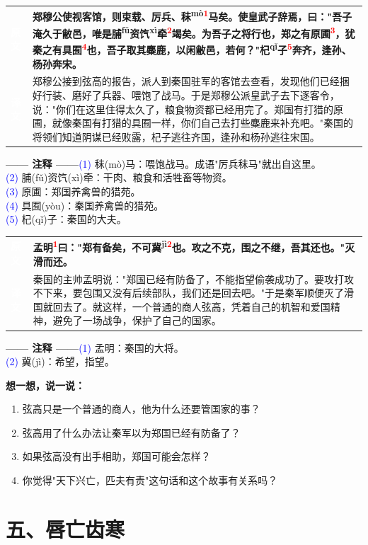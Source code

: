\documentclass[a4paper,12pt]{ctexart}
\makeatletter
\newcommand{\ruby}[2]{#1\textsuperscript{#2}}
\newlength{\colA}\setlength{\colA}{0.06\textwidth}
\newlength{\colB}\setlength{\colB}{0.64\textwidth}
\newlength{\colC}\setlength{\colC}{0.26\textwidth}
\newcommand{\sectab}[3]{%
  \noindent
  \begin{minipage}[c]{\dimexpr\colA+\colB+2\tabcolsep\relax}
  \begin{tabular}{@{}p{\colA}p{\colB}@{}}
  \sideyuan  & {\large\bfseries #1} \\
  \sideyiwen & {\large #2} \\
  \end{tabular}
  \end{minipage}
  \hfill
  \begin{minipage}[c]{\colC}
  {\labelann\vspace{0.1cm}}#3
  \end{minipage}
  \par
}
\newcommand{\sideyuan}{\colorbox{blue!70!black}{\textcolor{white}{\normalsize\textbf{原文}}}}
\newcommand{\sideyiwen}{\colorbox{green!60!black}{\textcolor{white}{\normalsize\textbf{译文}}}}
\newcommand{\labelann}{\textcolor{orange!80!black}{\small\textbf{—— 注释 ——}}}
\newcommand{\refmark}[1]{\textsuperscript{\textcolor{red}{#1}}}
\makeatother
\begin{document}
\vspace{0.3cm}
\sectab{郑穆公使视客馆，则束载、厉兵、\ruby{秣}{mò}\refmark{1}马矣。使皇武子辞焉，曰："吾子淹久于敝邑，唯是\ruby{脯}{fǔ}资\ruby{饩}{xì}牵\refmark{2}竭矣。为吾子之将行也，郑之有原圃\refmark{3}，犹秦之有具囿\refmark{4}也，吾子取其麋鹿，以闲敝邑，若何？"\ruby{杞}{qǐ}子\refmark{5}奔齐，逢孙、杨孙奔宋。}{郑穆公接到弦高的报告，派人到秦国驻军的客馆去查看，发现他们已经捆好行装、磨好了兵器、喂饱了战马。于是郑穆公派皇武子去下逐客令，说："你们在这里住得太久了，粮食物资都已经用完了。郑国有打猎的原圃，就像秦国有打猎的具囿一样，你们自己去打些麋鹿来补充吧。"秦国的将领们知道阴谋已经败露，杞子逃往齐国，逢孙和杨孙逃往宋国。}{{\small \textcolor{blue}{(1)} 秣(mò)马：喂饱战马。成语"厉兵秣马"就出自这里。}\\[0.1cm]{\small \textcolor{blue}{(2)} 脯(fǔ)资饩(xì)牵：干肉、粮食和活牲畜等物资。}\\[0.1cm]{\small \textcolor{blue}{(3)} 原圃：郑国养禽兽的猎苑。}\\[0.1cm]{\small \textcolor{blue}{(4)} 具囿(yòu)：秦国养禽兽的猎苑。}\\[0.1cm]{\small \textcolor{blue}{(5)} 杞(qǐ)子：秦国的大夫。}}

\vspace{0.3cm}
\sectab{孟明\refmark{1}曰："郑有备矣，不可\ruby{冀}{jì}\refmark{2}也。攻之不克，围之不继，吾其还也。"灭滑而还。}{秦国的主帅孟明说："郑国已经有防备了，不能指望偷袭成功了。要攻打攻不下来，要包围又没有后续部队，我们还是回去吧。"于是秦军顺便灭了滑国就回去了。就这样，一个普通的商人弦高，凭着自己的机智和爱国精神，避免了一场战争，保护了自己的国家。}{{\small \textcolor{blue}{(1)} 孟明：秦国的大将。}\\[0.1cm]{\small \textcolor{blue}{(2)} 冀(jì)：希望，指望。}}

\vspace{0.3cm}
{\large\textcolor{orange!80!black}{\textbf{想一想，说一说：}}}
\begin{enumerate}
  \item 弦高只是一个普通的商人，他为什么还要管国家的事？
  \item 弦高用了什么办法让秦军以为郑国已经有防备了？
  \item 如果弦高没有出手相助，郑国可能会怎样？
  \item 你觉得"天下兴亡，匹夫有责"这句话和这个故事有关系吗？
\end{enumerate}

\newpage

\section*{\textcolor{orange!80!black}{五、唇亡齿寒}}
\end{document}
